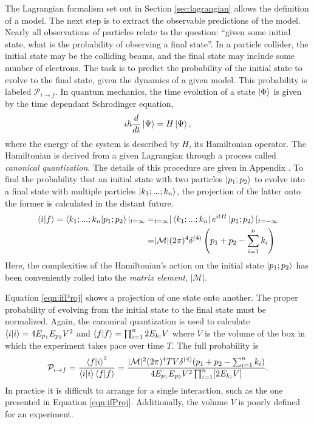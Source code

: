 The Lagrangian formalism set out in Section \ref{sec:lagrangian} allows the definition of a model.
The next step is to extract the observable predictions of the model.
Nearly all observations of particles relate to the question: ``given some initial state, what is the probability of observing a final state''.
In a particle collider, the initial state may be the colliding beams, and the final state may include some number of electrons.
The task is to predict the probability of the initial state to evolve to the final state, given the dynamics of a given model.
This probability is labeled $\mathcal{P}_{i\to f}$.
In quantum mechanics, the time evolution of a state $\ket{\Phi}$ is given by the time dependant Schrodinger equation,
\begin{equation}\begin{split}\label{eqn:schrodinger}
i\hbar\frac{d}{dt}\ket{\Psi}=H\ket{\Psi},
\end{split}\end{equation}
where the energy of the system is described by $H$, its Hamiltonian operator.
The Hamiltonian is derived from a given Lagrangian through a process called \emph{canonical quantization}. The details of this procedure are given in Appendix \label{sec:canQuant}.
To find the probability that an initial state with two particles $\ket{p_1;p_2}$ to evolve into a final state with multiple particles $\ket{k_1;...;k_n}$, the projection of the latter onto the former is calculated in the distant future.
\begin{equation}\begin{split}\label{eqn:ifProj}
\braket{i|f}=\braket{k_1;...;k_n|p_1;p_2}|_{t=\infty}=&_{t=\infty}|\bra{k_1;...;k_n}e^{itH}\ket{p_1;p_2}|_{t=-\infty} \\
=&|\mathcal{M}|(2\pi)^4\delta^{(4)}\left(p_1+p_2-\sum^n_{i=1} k_i\right) \\
\end{split}\end{equation}
Here, the complexities of the Hamiltonian's action on the initial state $\ket{p_1;p_2}$ has been conveniently rolled into the \emph{matrix element}, $|\mathcal{M}|$.

Equation \ref{eqn:ifProj} shows a projection of one state onto another.
The proper probability of evolving from the initial state to the final state must be normalized.
Again, the canonical quantization is used to calculate $\braket{i|i}=4E_{p_1}E_{p_2}V^2$ and $\braket{f|f}=\prod_{i=1}^n2E_{k_i}V$ where $V$ is the volume of the box in which the experiment takes pace over time $T$.
The full probability is
\begin{equation}\begin{split}\label{eqn:ifProb}
    \mathcal{P}_{i\to f}=\frac{\braket{f|i}^2}{\braket{i|i}\braket{f|f}}=\frac{|\mathcal{M}|^2(2\pi)^4TV\delta^{(4)}(p_1+p_2-\sum^n_{i=1} k_i)}{4E_{p_1}E_{p_2}V^2\prod_{i=1}^n[2E_{k_i}V]}.
\end{split}\end{equation}
In practice it is difficult to arrange for a single interaction, such as the one presented in Equation \ref{eqn:ifProj}.
Additionally, the volume $V$ is poorly defined for an experiment.

